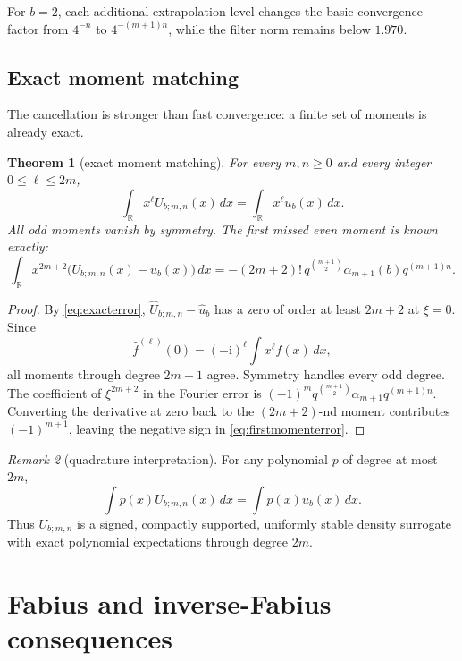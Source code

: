 \documentclass[11pt]{article}
\newtheorem{theorem}{Theorem}[section]
\theoremstyle{definition}
\theoremstyle{remark}
\newtheorem{remark}[theorem]{Remark}
\newcommand{\ii}{\mathrm{i}}
\newcommand{\R}{\mathbb{R}}
\begin{document}
For \(b=2\), each additional extrapolation level changes the basic convergence
factor from \(4^{-n}\) to \(4^{-(m+1)n}\), while the filter norm remains below
\(1.970\).

\subsection{Exact moment matching}

The cancellation is stronger than fast convergence: a finite set of moments is
already exact.

\begin{theorem}[exact moment matching]
\label{thm:moments}
For every \(m,n\geq0\) and every integer \(0\leq\ell\leq2m\),
\begin{equation}
 \int_{\R}x^\ell U_{b;m,n}(x)\,dx
 =\int_{\R}x^\ell u_b(x)\,dx.
 \label{eq:momentmatch}
\end{equation}
All odd moments vanish by symmetry. The first missed even moment is known
exactly:
\begin{equation}
 \int_{\R}x^{2m+2}\bigl(U_{b;m,n}(x)-u_b(x)\bigr)\,dx
 =-(2m+2)!\,q^{\binom{m+1}{2}}
 \alpha_{m+1}(b)q^{(m+1)n}.
 \label{eq:firstmomenterror}
\end{equation}
\end{theorem}

\begin{proof}
By \eqref{eq:exacterror},
\(\widehat U_{b;m,n}-\widehat u_b\) has a zero of order at least \(2m+2\) at
\(\xi=0\). Since
\[
 \widehat f^{(\ell)}(0)=(-\ii)^\ell\int x^\ell f(x)\,dx,
\]
all moments through degree \(2m+1\) agree. Symmetry handles every odd degree.
The coefficient of \(\xi^{2m+2}\) in the Fourier error is
\((-1)^mq^{\binom{m+1}{2}}\alpha_{m+1}q^{(m+1)n}\). Converting the derivative
at zero back to the \((2m+2)\)-nd moment contributes \((-1)^{m+1}\), leaving the
negative sign in \eqref{eq:firstmomenterror}.
\end{proof}

\begin{remark}[quadrature interpretation]
For any polynomial \(p\) of degree at most \(2m\),
\[
 \int p(x)U_{b;m,n}(x)\,dx=\int p(x)u_b(x)\,dx.
\]
Thus \(U_{b;m,n}\) is a signed, compactly supported, uniformly stable density
surrogate with exact polynomial expectations through degree \(2m\).
\end{remark}

\section{Fabius and inverse-Fabius consequences}
\label{sec:fabius}
\end{document}

